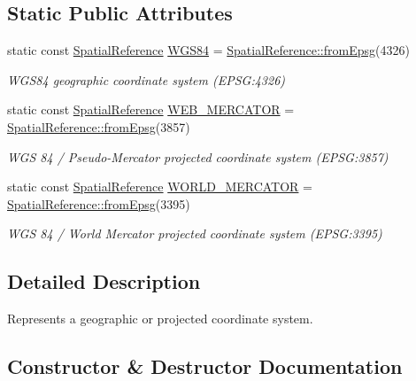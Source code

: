 \subsection*{Static Public Attributes}
\begin{DoxyCompactItemize}
\item 
static const \hyperlink{classdg_1_1deepcore_1_1imagery_1_1_spatial_reference}{Spatial\+Reference} \hyperlink{group___imagery_module_gaf868e08b25599956326615463649b0fa}{W\+G\+S84} = \hyperlink{group___imagery_module_ga417fb1f2ed62599e7e321d47b3f12121}{Spatial\+Reference\+::from\+Epsg}(4326)
\begin{DoxyCompactList}\small\item\em W\+G\+S84 geographic coordinate system (E\+P\+SG\+:4326) \end{DoxyCompactList}\item 
static const \hyperlink{classdg_1_1deepcore_1_1imagery_1_1_spatial_reference}{Spatial\+Reference} \hyperlink{group___imagery_module_ga66b2040219d82bc89193cc0a0bba177a}{W\+E\+B\+\_\+\+M\+E\+R\+C\+A\+T\+OR} = \hyperlink{group___imagery_module_ga417fb1f2ed62599e7e321d47b3f12121}{Spatial\+Reference\+::from\+Epsg}(3857)
\begin{DoxyCompactList}\small\item\em W\+GS 84 / Pseudo-\/\+Mercator projected coordinate system (E\+P\+SG\+:3857) \end{DoxyCompactList}\item 
static const \hyperlink{classdg_1_1deepcore_1_1imagery_1_1_spatial_reference}{Spatial\+Reference} \hyperlink{group___imagery_module_gaed40593efc83af9c4cebe9510256401b}{W\+O\+R\+L\+D\+\_\+\+M\+E\+R\+C\+A\+T\+OR} = \hyperlink{group___imagery_module_ga417fb1f2ed62599e7e321d47b3f12121}{Spatial\+Reference\+::from\+Epsg}(3395)
\begin{DoxyCompactList}\small\item\em W\+GS 84 / World Mercator projected coordinate system (E\+P\+SG\+:3395) \end{DoxyCompactList}\end{DoxyCompactItemize}


\subsection{Detailed Description}
Represents a geographic or projected coordinate system. 

\subsection{Constructor \& Destructor Documentation}
